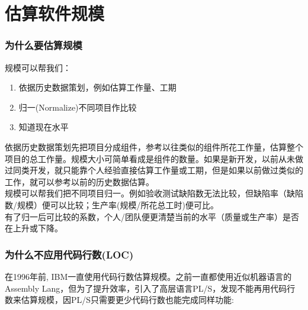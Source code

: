 \chapter{估算软件规模} %

\hypertarget{ux4e3aux4ec0ux4e48ux8981ux4f30ux7b97ux89c4ux6a21}{%
\subsection{为什么要估算规模}\label{ux4e3aux4ec0ux4e48ux8981ux4f30ux7b97ux89c4ux6a21}}

规模可以帮我们：

\begin{enumerate}
\tightlist
\item
  依据历史数据策划，例如估算工作量、工期
\item
  归一(Normalize)不同项目作比较
\item
  知道现在水平\\
\end{enumerate}

依据历史数据策划先把项目分成组件，参考以往类似的组件所花工作量，估算整个项目的总工作量。规模大小可简单看成是组件的数量。如果是新开发，以前从未做过同类开发，就只能靠个人经验直接估算工作量或工期，但是如果以前做过类似的工作，就可以参考以前的历史数据估算。\\
规模可以帮我们把不同项目归一。例如验收测试缺陷数无法比较，但缺陷率（缺陷数/规模）便可以比较；生产率(规模/所花总工时)便可比。\\
有了归一后可比较的系数，个人/团队便更清楚当前的水平（质量或生产率）是否在上升或下降。

\hypertarget{ux4e3aux4ec0ux4e48ux4e0dux5e94ux7528ux4ee3ux7801ux884cux6570loc}{%
\subsection{为什么不应用代码行数(LOC)}\label{ux4e3aux4ec0ux4e48ux4e0dux5e94ux7528ux4ee3ux7801ux884cux6570loc}}

在1996年前, IBM一直使用代码行数估算规模。之前一直都使用近似机器语言的Assembly
Lang，但为了提升效率，引入了高层语言PL/S，发现不能再用代码行数来估算规模，因PL/S只需要更少代码行数也能完成同样功能:


